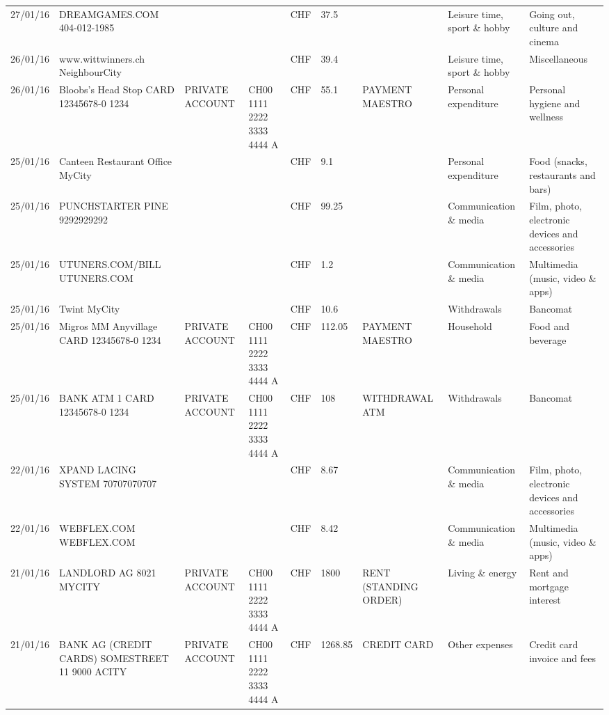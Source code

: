 \begin{landscape}
\begin{center}
\begin{longtable}{lllllllll}
		27/01/16 & DREAMGAMES.COM           404-012-1985 &       &       & CHF   & 37.5  &       & Leisure time, sport \& hobby & Going out, culture and cinema \\
		26/01/16 & www.wittwinners.ch        NeighbourCity &       &       & CHF   & 39.4  &       & Leisure time, sport \& hobby & Miscellaneous \\
		26/01/16 & Bloobs's Head Stop CARD 12345678-0 1234 & PRIVATE ACCOUNT & CH00 1111 2222 3333 4444 A & CHF   & 55.1  & PAYMENT MAESTRO & Personal expenditure & Personal hygiene and wellness \\
		25/01/16 & Canteen Restaurant Office      MyCity &       &       & CHF   & 9.1   &       & Personal expenditure & Food (snacks, restaurants and bars) \\
		25/01/16 & PUNCHSTARTER PINE   9292929292 &       &       & CHF   & 99.25 &       & Communication \& media & Film, photo, electronic devices and accessories \\
		25/01/16 & UTUNERS.COM/BILL          UTUNERS.COM &       &       & CHF   & 1.2   &       & Communication \& media & Multimedia (music, video \& apps) \\
		25/01/16 & Twint               MyCity &       &       & CHF   & 10.6  &       & Withdrawals & Bancomat \\
		25/01/16 & Migros MM Anyvillage CARD 12345678-0 1234 & PRIVATE ACCOUNT & CH00 1111 2222 3333 4444 A & CHF   & 112.05 & PAYMENT MAESTRO & Household & Food and beverage \\
		25/01/16 & BANK ATM 1 CARD 12345678-0 1234 & PRIVATE ACCOUNT & CH00 1111 2222 3333 4444 A & CHF   & 108   & WITHDRAWAL ATM & Withdrawals & Bancomat \\
		22/01/16 & XPAND LACING SYSTEM      70707070707 &       &       & CHF   & 8.67  &       & Communication \& media & Film, photo, electronic devices and accessories \\
		22/01/16 & WEBFLEX.COM              WEBFLEX.COM &       &       & CHF   & 8.42  &       & Communication \& media & Multimedia (music, video \& apps) \\
		21/01/16 & LANDLORD AG 8021 MYCITY & PRIVATE ACCOUNT & CH00 1111 2222 3333 4444 A & CHF   & 1800  & RENT (STANDING ORDER) & Living \& energy & Rent and mortgage interest \\
		21/01/16 & BANK AG (CREDIT CARDS) SOMESTREET 11 9000 ACITY & PRIVATE ACCOUNT & CH00 1111 2222 3333 4444 A & CHF   & 1268.85 & CREDIT CARD & Other expenses & Credit card invoice and fees \\

\end{longtable}
\end{center}
\end{landscape}
